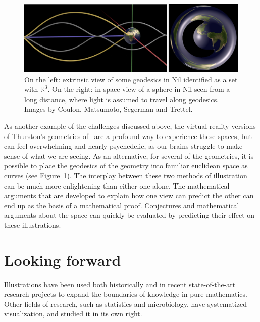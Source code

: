 \documentclass{notices}
\begin{document}
\begin{figure}
    \includegraphics[width=\textwidth]{images/nil.png}
    \caption{
    On the left: extrinsic view of some geodesics in Nil identified as a set with  $\mathbb R^3$.
    On the right: in-space view of a sphere in Nil seen from a long distance, where light is assumed to travel along geodesics.
    Images by Coulon, Matsumoto, Segerman and Trettel.
    }
    \label{fig:nil-geo}
\end{figure}

As another example of the challenges discussed above, the virtual reality versions of Thurston's geometries of~\cite{Coulon:2020ac} are a profound way to experience these spaces, but can feel overwhelming and nearly psychedelic, as our brains struggle to make sense of what we are seeing.
As an alternative, for several of the geometries, it is possible to place the geodesics of the geometry into familiar euclidean space as curves (see Figure~\ref{fig:nil-geo}).
The interplay between these two methods of illustration can be much more enlightening than either one alone.  
The mathematical arguments that are developed to explain how one view can predict the other can end up as the basis of a mathematical proof.  
Conjectures and mathematical arguments about the space can quickly be evaluated by predicting their effect on these illustrations.

\section*{Looking forward}

Illustrations have been used both historically and in recent state-of-the-art research projects to expand the boundaries of knowledge in pure mathematics. 
Other fields of research, such as statistics and microbiology, have systematized visualization, and studied it in its own right.
\end{document}
